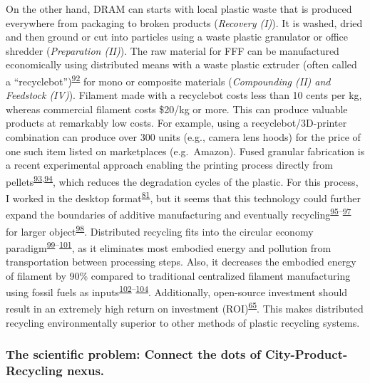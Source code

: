 \documentclass[
  12pt,
  a4paperpaper,
  onecolumn]{article}
\begin{document}
On the other hand, DRAM can starts with local plastic waste that is
produced everywhere from packaging to broken products (\emph{Recovery
(I)}). It is washed, dried and then ground or cut into particles using a
waste plastic granulator or office shredder (\emph{Preparation (II)}).
The raw material for FFF can be manufactured economically using
distributed means with a waste plastic extruder (often called a
``recyclebot'')\textsuperscript{\protect\hyperlink{ref-Baechler2013}{92}}
for mono or composite materials (\emph{Compounding (II) and Feedstock
(IV)}). Filament made with a recyclebot costs less than 10 cents per kg,
whereas commercial filament costs \$20/kg or more. This can produce
valuable products at remarkably low costs. For example, using a
recyclebot/3D-printer combination can produce over 300 units (e.g.,
camera lens hoods) for the price of one such item listed on marketplaces
(e.g.~Amazon). Fused granular fabrication is a recent experimental
approach enabling the printing process directly from
pellets\textsuperscript{\protect\hyperlink{ref-JustinoNetto2021}{93},\protect\hyperlink{ref-netto2022}{94}},
which reduces the degradation cycles of the plastic. For this process, I
worked in the desktop
format\textsuperscript{\protect\hyperlink{ref-Arthur2020}{81}}, but it
seems that this technology could further expand the boundaries of
additive manufacturing and eventually
recycling\textsuperscript{\protect\hyperlink{ref-billah2021}{95}--\protect\hyperlink{ref-Byard2019}{97}}
for larger
object\textsuperscript{\protect\hyperlink{ref-petsiuk2022}{98}}.
Distributed recycling fits into the circular economy
paradigm\textsuperscript{\protect\hyperlink{ref-Zhong2018}{99}--\protect\hyperlink{ref-Despeisse2016}{101}},
as it eliminates most embodied energy and pollution from transportation
between processing steps. Also, it decreases the embodied energy of
filament by 90\% compared to traditional centralized filament
manufacturing using fossil fuels as
inputs\textsuperscript{\protect\hyperlink{ref-Kreiger2013}{102}--\protect\hyperlink{ref-Horta2017}{104}}.
Additionally, open-source investment should result in an extremely high
return on investment
(ROI)\textsuperscript{\protect\hyperlink{ref-Pearce2020a}{65}}. This
makes distributed recycling environmentally superior to other methods of
plastic recycling systems.

\hypertarget{the-scientific-problem-connect-the-dots-of-city-product-recycling-nexus.}{%
\subsubsection{The scientific problem: Connect the dots of
City-Product-Recycling
nexus.}\label{the-scientific-problem-connect-the-dots-of-city-product-recycling-nexus.}}
\end{document}
